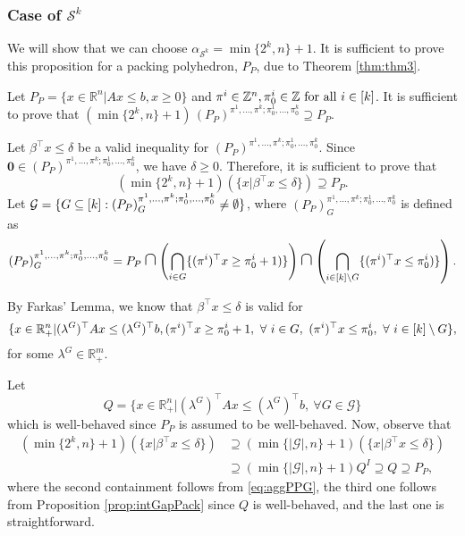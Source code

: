 \documentclass[11pt]{article}
\newcommand{\Z}{\mathbb{Z}}
\newcommand{\R}{\mathbb{R}}
\newcommand{\seq}{\subseteq}
\renewcommand{\S}{\mathcal{S}}
\newcommand{\zeros}{\boldsymbol{0}}
\newcommand*{\medcap}{\mathbin{\scalebox{1.5}{\ensuremath{\cap}}}}%
\newcommand{\bpar}{\beta}
\newcommand{\cred}{\color{black}}
\begin{document}
\subsubsection{Case of $\S^k$}
\label{subsubsec:4.5.2}

We will show that {\cred we can choose $\alpha_{\S^k} = \min \{ 2^k,n \}+1$}. It is sufficient to prove this proposition for a packing polyhedron, $P_P$, due to Theorem \ref{thm:thm3}.

Let $P_P = \{ x \in \R^n | Ax \leq b, x \geq 0\}$ and $\pi^i \in \Z^n, \pi^i_0 \in \Z \textup{ for all } i \in [k]$. It is sufficient to prove that $(\min\{2^k,n\}+1) \, (P_P)^{\pi^1,\dots, \pi^k;\pi^1_0, \dots, \pi^k_0} \supseteq  P_P$.

Let $\bpar^\top x \leq \delta$ be a valid inequality for $(P_P)^{\pi^1,\dots, \pi^k;\pi^1_0, \dots, \pi^k_0}$. Since \\ $\zeros \in (P_P)^{\pi^1,\dots, \pi^k;\pi^1_0, \dots, \pi^k_0}$, we have $\delta \geq 0$. Therefore, it is sufficient to prove that 
$$(\min\{2^k,n\}+1) \left(  \{ x | \bpar^\top x \leq \delta \} \right) \supseteq  P_P.$$
Let $\mathcal{G} = \{ G \seq {\cred [k]} : (P_P)_G^{{\pi}^1,\dots, {\pi}^k;\pi^1_0, \dots, \pi^k_0} \neq \emptyset \}$, where $(P_P)_G^{{\pi}^1,\dots, {\pi}^k;\pi^1_0, \dots, \pi^k_0}$ is defined as %
$$(P_P)_G^{\pi^1,\dots, \pi^k;\pi^1_0, \dots, \pi^k_0} = P_P \medcap \left(\bigcap_{i \in G} \{ (\pi^i)^\top x \geq \pi^i_0 + 1)\} \right)\medcap \left(\bigcap_{i \in {\cred [k]} \setminus G} \{ (\pi^i)^\top x \leq \pi^i_0)\}\right).$$

By Farkas' Lemma, we know that $\bpar^\top x \leq \delta$ is valid for 
\begin{equation}
\label{eq:aggPPG}
\{ x \in \R_+^n | (\lambda^G)^\top A x \leq (\lambda^G)^\top b, (\pi^i)^\top x \geq \pi^i_0 + 1, \ \forall \ i \in G, \ (\pi^i)^\top x \leq \pi^i_0, \ \forall \ i \in {\cred [k]} \setminus G \},
\end{equation}
for some $\lambda^G \in \R_+^m$.

Let 
$$Q = \{ x \in \R_+^n | (\lambda^G)^\top A x \leq (\lambda^G)^\top b, \ \forall G \in \mathcal{G} \} $$
which is well-behaved since $P_P$ is assumed to be well-behaved. Now, observe that 
\begin{align*}
(\min\{2^k,n\}+1) \left(  \{ x | \bpar^\top x \leq \delta \} \right) & \supseteq (\min\{|\mathcal{G}|,n\}+1) \left(  \{ x | \bpar^\top x \leq \delta \} \right)  \\
& \supseteq (\min\{|\mathcal{G}|,n\}+1) Q^I \supseteq Q \supseteq P_P,
\end{align*}
where the second containment follows from \eqref{eq:aggPPG}, the third one follows from {\cred Proposition \ref{prop:intGapPack}} since $Q$ is well-behaved, and the last one is straightforward.
\end{document}
